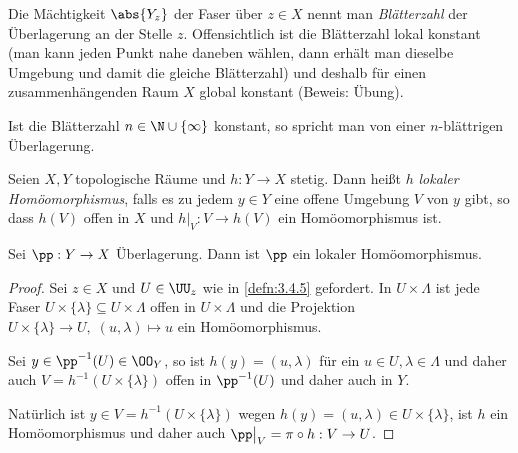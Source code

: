 Die Mächtigkeit $\abs{Y_z}$ der Faser über $z\in X$ nennt man
\emph{Blätterzahl} der Überlagerung an der Stelle $z$. Offensichtlich ist die
Blätterzahl lokal konstant (man kann jeden Punkt nahe daneben wählen, dann
erhält man dieselbe Umgebung  und damit die gleiche Blätterzahl) und deshalb
für einen zusammenhängenden Raum $X$ global konstant (Beweis: Übung).

Ist die Blätterzahl $n\in\N\cup\{\infty\}$ konstant, so spricht man von einer
$n$-blättrigen Überlagerung.

\begin{defn}
\label{defn:3.4.6}
Seien $X,Y$ topologische Räume und $h: Y\to X$ stetig. Dann heißt $h$
\emph{lokaler Homöomorphismus}, falls es zu jedem $y\in Y$ eine offene Umgebung
$V$ von $y$ gibt, so dass $h(V)$ offen in $X$ und $h\big|_V : V\to h(V)$ ein
Homöomorphismus ist.\fishhere
\end{defn}

\begin{lem}
\label{prop:3.4.7}
Sei $\pp: Y\to X$ Überlagerung. Dann ist $\pp$ ein lokaler
Homöomorphismus.\fishhere
\end{lem}
\begin{proof}
Sei $z\in X$ und $U\in\UU_z$ wie in \ref{defn:3.4.5} gefordert. In
$U\times\Lambda$ ist jede Faser $U\times\{\lambda\}\subseteq U\times \Lambda$ 
offen in $U\times\Lambda$ und die Projektion $U\times\{\lambda\}\to
U,\;(u,\lambda)\mapsto u$ ein Homöomorphismus.

Sei $y\in\pp^{-1}(U)\in\OO_Y$, so ist $h(y) = (u,\lambda)$ für ein $u\in
U,\lambda\in\Lambda$ und daher auch $V=h^{-1}(U\times\{\lambda\})$ offen in
$\pp^{-1}(U)$ und daher auch in $Y$.

Natürlich ist $y\in V=h^{-1}(U\times\{\lambda\})$ wegen $h(y) = (u,\lambda) \in
U\times\{\lambda\}$, ist $h$ ein Homöomorphismus und daher auch $\pp\big|_{V} =
\pi\circ h: V\to U$.\qedhere
\end{proof}

